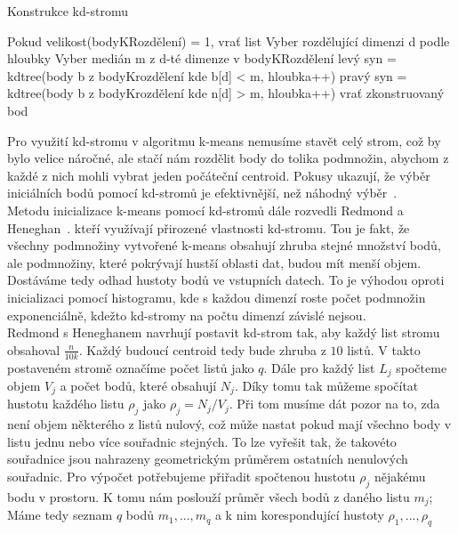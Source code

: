 \begin{algorithm}
\caption{Konstrukce kd-stromu}\label{alg:kdtreeconstruction}
\begin{algorithmic}[1]
\State Pokud velikost(bodyKRozdělení) = 1, vrať list
\State Vyber rozdělující dimenzi d podle hloubky
\State Vyber medián m z d-té dimenze v bodyKRozdělení
\State levý syn = kdtree(body b z bodyKrozdělení kde b[d] < m, hloubka++)
\State pravý syn = kdtree(body b z bodyKrozdělení kde n[d] > m, hloubka++)
\State vrať zkonstruovaný bod
\EndFunction
\end{algorithmic}
\end{algorithm}

Pro využití kd-stromu v algoritmu k-means nemusíme stavět celý strom, což by bylo velice náročné, ale stačí nám rozdělit body do tolika podmnožin, abychom z každé z nich mohli vybrat jeden počáteční centroid. Pokusy ukazují, že výběr iniciálních bodů pomocí kd-stromů je efektivnější, než náhodný výběr~\cite{Pahala10}.\\

Metodu inicializace k-means pomocí kd-stromů dále rozvedli Redmond a Heneghan~\cite{redmond07}. kteří využívají přirozené vlastnosti kd-stromu. Tou je fakt, že všechny podmnožiny vytvořené k-means obsahují zhruba stejné množství bodů, ale podmnožiny, které pokrývají hustší oblasti dat, budou mít menší objem. Dostáváme tedy odhad hustoty bodů ve vstupních datech. To je výhodou oproti inicializaci pomocí histogramu, kde s každou dimenzí roste počet podmnožin exponenciálně, kdežto kd-stromy na počtu dimenzí závislé nejsou.\\

Redmond s Heneghanem navrhují postavit kd-strom tak, aby každý list stromu obsahoval $\frac{n}{10k}$. Každý budoucí centroid tedy bude zhruba z $10$ listů. V takto postaveném stromě označíme počet listů jako $q$. Dále pro každý list $L_j$ spočteme objem $V_j$ a počet bodů, které obsahují $N_j$. Díky tomu tak můžeme spočítat hustotu každého listu $\rho_j$ jako $\rho_j=N_j/V_j$. Při tom musíme dát pozor na to, zda není objem některého z listů nulový, což může nastat pokud mají všechno body v listu jednu nebo více souřadnic stejných. To lze vyřešit tak, že takovéto souřadnice jsou nahrazeny geometrickým průměrem ostatních nenulových souřadnic. Pro výpočet potřebujeme přiřadit spočtenou hustotu $\rho_j$ nějakému bodu v prostoru. K tomu nám poslouží průměr všech bodů z daného listu $m_j$; Máme tedy seznam $q$ bodů $m_1,...,m_q$ a k nim korespondující hustoty $\rho_1,...,\rho_q$\\

